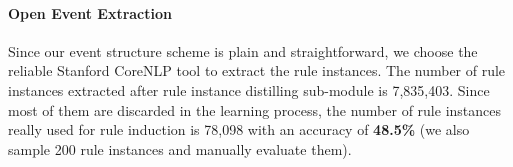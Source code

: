 

\paragraph{Open Event Extraction}
Since our event structure scheme is plain and straightforward, we choose the reliable Stanford CoreNLP tool \cite{Manning} to extract the rule instances.
The number of rule instances extracted after rule instance distilling sub-module is 7,835,403. Since most of them are discarded in the learning process, the number of rule instances really used for rule induction is 78,098 with an accuracy of \textbf{48.5\%} (we also sample 200 rule instances and manually evaluate them).

